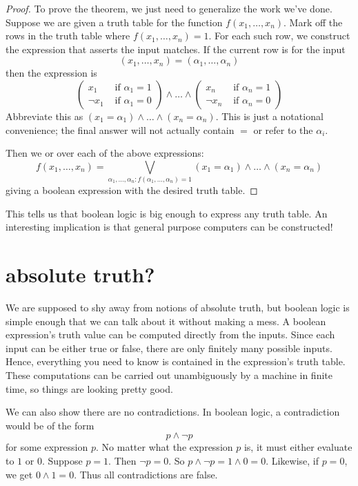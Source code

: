 \documentclass{scrbook}
\begin{document}
\begin{proof}
To prove the theorem, we just need to generalize the work we've done. Suppose we are given a truth table for the function $f(x_1,\dots, x_n)$. Mark off the rows in the truth table where $f(x_1,\dots,x_n)=1$. For each such row, we construct the expression that asserts the input matches. If the current row is for the input
\[
(x_1,\dots, x_n)=(\alpha_1,\dots, \alpha_n)
\]
then the expression is
\[
\left (
  \begin{matrix}
    x_1 & \textrm{ if } \alpha_1=1 \\
    \neg x_1 & \textrm { if } \alpha_1=0
  \end{matrix}
\right)
\wedge
\dots
\wedge
\left (
  \begin{matrix}
    x_n & \textrm{ if } \alpha_n=1 \\
    \neg x_n & \textrm { if } \alpha_n=0
  \end{matrix}
\right)
\]
Abbreviate this as $(x_1=\alpha_1)\wedge \dots \wedge (x_n=\alpha_n)$. This is just a notational convenience; the final answer will not actually contain $=$ or refer to the $\alpha_i$. 

Then we or over each of the above expressions: 
\[
f(x_1,\dots,x_n)= \bigvee_{\alpha_1,\dots,\alpha_n: f(\alpha_1,\dots,\alpha_n)=1} (x_1=\alpha_1)\wedge \dots \wedge (x_n=\alpha_n)
\]
giving a boolean expression with the desired truth table. 
\end{proof}
This tells us that boolean logic is big enough to express any truth table. An interesting implication is that general purpose computers can be constructed!
\section[Absolute Truth?]{absolute truth?}
We are supposed to shy away from notions of absolute truth, but boolean logic is simple enough that we can talk about it without making a mess. A boolean expression's truth value can be computed directly from the inputs. Since each input can be either true or false, there are only finitely many possible inputs. Hence, everything you need to know is contained in the expression's truth table. These computations can be carried out unambiguously by a machine in finite time, so things are looking pretty good.

We can also show there are no contradictions. In boolean logic, a contradiction would be of the form
\[
p \wedge \neg p
\]
for some expression $p$. No matter what the expression $p$ is, it must either evaluate to $1$ or $0$. Suppose $p=1$. Then $\neg p=0$. So $p\wedge \neg p = 1 \wedge 0 =0$. Likewise, if $p=0$, we get $0\wedge 1=0$. Thus all contradictions are false.
\end{document}

